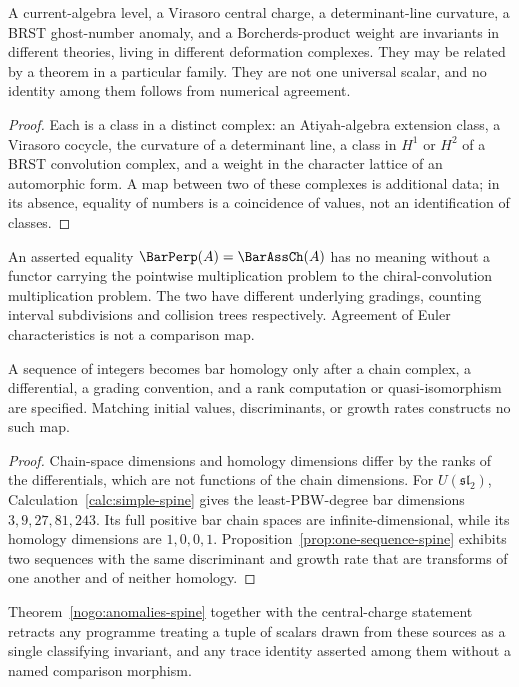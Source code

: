 \begin{theorem}
\label{nogo:anomalies-spine}
A current-algebra level, a Virasoro central charge, a determinant-line
curvature, a BRST ghost-number anomaly, and a Borcherds-product weight are
invariants in different theories, living in different deformation complexes.
They may be related by a theorem in a particular family. They are not one
universal scalar, and no identity among them follows from numerical agreement.
\end{theorem}
\begin{proof}
Each is a class in a distinct complex: an Atiyah-algebra extension class, a
Virasoro cocycle, the curvature of a determinant line, a class in $H^1$ or
$H^2$ of a BRST convolution complex, and a weight in the character lattice of
an automorphic form. A map between two of these complexes is additional data;
in its absence, equality of numbers is a coincidence of values, not an
identification of classes.
\end{proof}

\begin{theorem}
An asserted equality $\BarPerp(A)=\BarAssCh(A)$ has no meaning without a
functor carrying the pointwise multiplication problem to the chiral-convolution
multiplication problem. The two have different underlying gradings, counting
interval subdivisions and collision trees respectively. Agreement of Euler
characteristics is not a comparison map.
\end{theorem}

\begin{theorem}
\label{nogo:scalar-spine}
A sequence of integers becomes bar homology only after a chain complex, a
differential, a grading convention, and a rank computation or quasi-isomorphism
are specified. Matching initial values, discriminants, or growth rates
constructs no such map.
\end{theorem}
\begin{proof}
Chain-space dimensions and homology dimensions differ by the ranks of the
differentials, which are not functions of the chain dimensions.
For $U(\mathfrak{sl}_2)$, Calculation~\ref{calc:simple-spine} gives the least-PBW-degree bar dimensions $3,9,27,81,243$.
Its full positive bar chain spaces are infinite-dimensional, while its homology dimensions are $1,0,0,1$.
Proposition~\ref{prop:one-sequence-spine} exhibits two sequences with the same
discriminant and growth rate that are transforms of one another and of neither
homology.
\end{proof}

Theorem~\ref{nogo:anomalies-spine} together with the central-charge statement
retracts any programme treating a tuple of scalars drawn from these sources as
a single classifying invariant, and any trace identity asserted among them
without a named comparison morphism.
